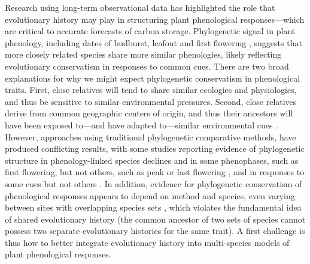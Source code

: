\documentclass[11pt]{article}
\begin{document}
Research using long-term observational data has highlighted the role that evolutionary history may play in structuring plant phenological responses---which are critical to accurate forecasts of carbon storage. Phylogenetic signal in plant phenology, including dates of budburst, leafout and first flowering \citep{kochmer1986constraints,willis2008phylogenetic,davies2013phylogenetic}, suggests that more closely related species share more similar phenologies, likely reflecting evolutionary conservatism in responses to common cues. There are two broad explanations for why we might expect phylogenetic conservatism in phenological traits. First, close relatives will tend to share similar ecologies and physiologies, and thus be sensitive to similar environmental pressures. Second, close relatives derive from common geographic centers of origin, and thus their ancestors will have been exposed to---and have adapted to---similar environmental cues \citep{davies2013phylogenetic}. 
However, approaches using traditional phylogenetic comparative methods, have produced conflicting results, with some studies reporting evidence of phylogenetic structure in phenology-linked species declines \citep[e.g.,][]{willis2008phylogenetic} and in some phenophases, such as first flowering, but not others, such as peak or last flowering \citep[e.g.,][]{CaraDonna2015}, and in responses to some cues but not others \citep[e.g.,][]{yang2021afm}. In addition, evidence for phylogenetic conservatism of phenological responses appears to depend on method and species, even varying between sites with overlapping species sets \citep[e.g.,][]{rafferty2017global}, which violates the fundamental idea of shared evolutionary history (the common ancestor of two sets of species cannot possess two separate evolutionary histories for the same trait). A first challenge is thus how to better integrate evolutionary history into multi-species models of plant phenological responses.
\end{document}
